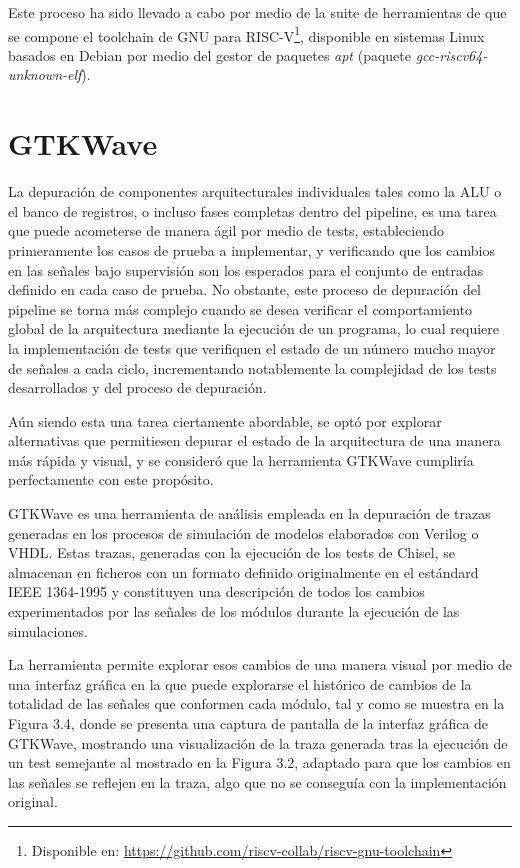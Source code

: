 Este proceso ha sido llevado a cabo por medio de la suite de herramientas de que se compone el toolchain de GNU para RISC-V\footnote{Disponible en: \url{https://github.com/riscv-collab/riscv-gnu-toolchain}}, disponible en sistemas Linux basados en Debian por medio del gestor de paquetes \textit{apt} (paquete \textit{gcc-riscv64-unknown-elf}).

\section{GTKWave}

La depuración de componentes arquitecturales individuales tales como la ALU o el banco de registros, o incluso fases completas dentro del pipeline, es una tarea que puede acometerse de manera ágil por medio de tests, estableciendo primeramente los casos de prueba a implementar, y verificando que los cambios en las señales bajo supervisión son los esperados para el conjunto de entradas definido en cada caso de prueba. No obstante, este proceso de depuración del pipeline se torna más complejo cuando se desea verificar el comportamiento global de la arquitectura mediante la ejecución de un programa, lo cual requiere la implementación de tests que verifiquen el estado de un número mucho mayor de señales a cada ciclo, incrementando notablemente la complejidad de los tests desarrollados y del proceso de depuración.

Aún siendo esta una tarea ciertamente abordable, se optó por explorar alternativas que permitiesen depurar el estado de la arquitectura de una manera más rápida y visual, y se consideró que la herramienta GTKWave cumpliría perfectamente con este propósito.

GTKWave es una herramienta de análisis empleada en la depuración de trazas generadas en los procesos de simulación de modelos elaborados con Verilog o VHDL. Estas trazas, generadas con la ejecución de los tests de Chisel, se almacenan en ficheros con un formato definido originalmente en el estándard IEEE 1364-1995\cite{IEEE1364} y constituyen una descripción de todos los cambios experimentados por las señales de los módulos durante la ejecución de las simulaciones.

La herramienta permite explorar esos cambios de una manera visual por medio de una interfaz gráfica en la que puede explorarse el histórico de cambios de la totalidad de las señales que conformen cada módulo, tal y como se muestra en la Figura 3.4, donde se presenta una captura de pantalla de la interfaz gráfica de GTKWave, mostrando una visualización de la traza generada tras la ejecución de un test semejante al mostrado en la Figura 3.2, adaptado para que los cambios en las señales se reflejen en la traza, algo que no se conseguía con la implementación original.

